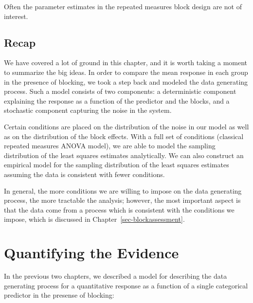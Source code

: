 \documentclass[
  letterpaper,
  DIV=11,
  numbers=noendperiod]{scrreprt}
\theoremstyle{plain}
\theoremstyle{definition}
\theoremstyle{definition}
\theoremstyle{remark}
\begin{document}
\begin{tcolorbox}[enhanced jigsaw, breakable, titlerule=0mm, colframe=quarto-callout-note-color-frame, bottomtitle=1mm, opacityback=0, rightrule=.15mm, toptitle=1mm, arc=.35mm, bottomrule=.15mm, left=2mm, title=\textcolor{quarto-callout-note-color}{\faInfo}\hspace{0.5em}{Note}, leftrule=.75mm, coltitle=black, toprule=.15mm, colbacktitle=quarto-callout-note-color!10!white, colback=white, opacitybacktitle=0.6]

Often the parameter estimates in the repeated measures block design are
not of interest.

\end{tcolorbox}

\section{Recap}\label{recap-2}

We have covered a lot of ground in this chapter, and it is worth taking
a moment to summarize the big ideas. In order to compare the mean
response in each group in the presence of blocking, we took a step back
and modeled the data generating process. Such a model consists of two
components: a deterministic component explaining the response as a
function of the predictor and the blocks, and a stochastic component
capturing the noise in the system.

Certain conditions are placed on the distribution of the noise in our
model as well as on the distribution of the block effects. With a full
set of conditions (classical repeated measures ANOVA model), we are able
to model the sampling distribution of the least squares estimates
analytically. We can also construct an empirical model for the sampling
distribution of the least squares estimates assuming the data is
consistent with fewer conditions.

In general, the more conditions we are willing to impose on the data
generating process, the more tractable the analysis; however, the most
important aspect is that the data come from a process which is
consistent with the conditions we impose, which is discussed in
Chapter~\ref{sec-blockassessment}.

\chapter{Quantifying the Evidence}\label{sec-blockteststat}

In the previous two chapters, we described a model for describing the
data generating process for a quantitative response as a function of a
single categorical predictor in the presense of blocking:
\end{document}
